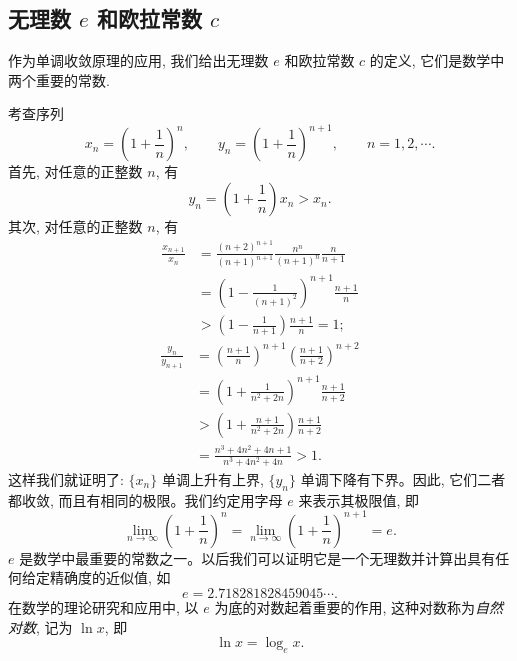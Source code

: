 \subsection{\texorpdfstring{无理数 $e$ 和欧拉常数 $c$}{无理数 e 和欧拉常数 c}}
\label{subsec:ma-2-3-2}

作为单调收敛原理的应用, 我们给出无理数 $e$ 和欧拉常数 $c$ 的定义, 它们是数学中两个重要的常数.

考查序列
\[
  x_n=\left(1+\frac1n\right)^n,\qquad
  y_n=\left(1+\frac1n\right)^{n+1},\qquad n=1,2,\cdots.
\]
首先, 对任意的正整数 $n$, 有
\[
  y_n=\left(1+\frac1n\right)x_n>x_n.
\]
其次, 对任意的正整数 $n$, 有
\[
\begin{aligned}
  \frac{x_{n+1}}{x_n}
  &=
  \frac{(n+2)^{n+1}}{(n+1)^{n+1}}\frac{n^n}{(n+1)^n}\frac n{n+1}\\
  &=
  \left(1-\frac1{(n+1)^2}\right)^{n+1}\frac{n+1}{n}\\
  &>
  \left(1-\frac1{n+1}\right)\frac{n+1}{n}
  =
  1;
\end{aligned}
\]
\[
\begin{aligned}
  \frac{y_n}{y_{n+1}}
  &=
  \left(\frac{n+1}{n}\right)^{n+1}
  \left(\frac{n+1}{n+2}\right)^{n+2}\\
  &=
  \left(1+\frac1{n^2+2n}\right)^{n+1}\frac{n+1}{n+2}\\
  &>
  \left(1+\frac{n+1}{n^2+2n}\right)\frac{n+1}{n+2}\\
  &=
  \frac{n^3+4n^2+4n+1}{n^3+4n^2+4n}>1.
\end{aligned}
\]
这样我们就证明了: $\{x_n\}$ 单调上升有上界, $\{y_n\}$ 单调下降有下界。因此, 它们二者都收敛, 而且有相同的极限。我们约定用字母 $e$ 来表示其极限值, 即
\[
  \lim_{n\to\infty}\left(1+\frac1n\right)^n
  =
  \lim_{n\to\infty}\left(1+\frac1n\right)^{n+1}
  =
  e.
\]
$e$ 是数学中最重要的常数之一。以后我们可以证明它是一个无理数并计算出具有任何给定精确度的近似值, 如
\[
  e=2.718281828459045\cdots.
\]
在数学的理论研究和应用中, 以 $e$ 为底的对数起着重要的作用, 这种对数称为\emph{自然对数}, 记为 $\ln x$, 即
\[
  \ln x=\log_e x.
\]

